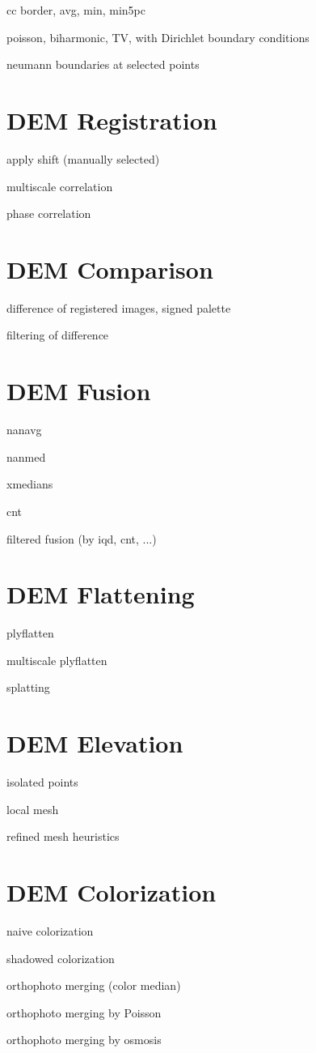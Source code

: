 cc border, avg, min, min5pc

poisson, biharmonic, TV, with Dirichlet boundary conditions

neumann boundaries at selected points


\section{DEM Registration}

apply shift (manually selected)

multiscale correlation

phase correlation


\section{DEM Comparison}


difference of registered images, signed palette

filtering of difference


\section{DEM Fusion}

nanavg

nanmed

xmedians

cnt

filtered fusion (by iqd, cnt, ...)


\section{DEM Flattening}

plyflatten

multiscale plyflatten

splatting


\section{DEM Elevation}

isolated points

local mesh

refined mesh heuristics


\section{DEM Colorization}

naive colorization

shadowed colorization

orthophoto merging (color median)

orthophoto merging by Poisson

orthophoto merging by osmosis



